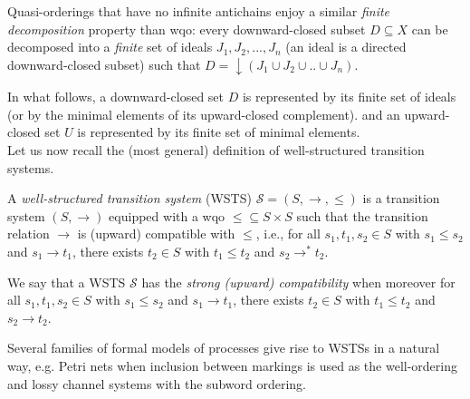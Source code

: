 \noindent
Quasi-orderings that have no infinite antichains enjoy a similar \emph{finite decomposition} property than wqo: every downward-closed subset $D \subseteq X$ can be decomposed into a \emph{finite} set of ideals $J_1, J_2,..., J_n$ (an ideal is a directed downward-closed subset) such that $D = \downarrow (J_1 \cup J_2 \cup..\cup J_n)$.

In what follows, a downward-closed set $D$ is represented by its finite set of ideals (or by the minimal elements of its upward-closed complement).
and an upward-closed set $U$ is represented by its finite set of minimal elements. \\

\noindent
Let us now recall the (most general) definition of well-structured transition systems.

\begin{definition}\cite{DBLP:journals/iandc/Finkel90,DBLP:journals/tcs/FinkelS01}
A {\em well-structured transition system} (WSTS)  $\mathscr{S}=(S, \rightarrow, \leq)$
is a transition system $(S, \rightarrow)$
equipped with a wqo ${\leq} \subseteq S \times S$ such that  
the transition relation $ \rightarrow$ is (upward) compatible with $\leq$, i.e., for all 
$s_1, t_1 , s_2 \in S$
	with $s_1 \leq s_2$  and $s_1 \rightarrow t_1$, there exists 
	$t_2 \in S$ with 
	$t_1 \leq t_2$ and $s_2 \rightarrow^{*} t_2$.
\end{definition}

We say that a WSTS $\mathscr{S}$ has the \emph{strong (upward) compatibility} when moreover for all 
$s_1, t_1 , s_2 \in S$
	with $s_1 \leq s_2$  and $s_1 \rightarrow t_1$, there exists 
	$t_2 \in S$ with 
	$t_1 \leq t_2$ and $s_2 \rightarrow t_2$.

Several families of formal models of processes give rise to WSTSs in a natural way, e.g. Petri nets when inclusion between markings is used as the well-ordering and lossy channel systems with the subword ordering.


\iffalse
\begin{proposition}\cite{DBLP:journals/tcs/FinkelS01}
If $\mathscr{S}$ is an WSTS and $U \subseteq S$ is an upward-closed set of states, then $\pred^*(U )$ is upward-
closed.
\end{proposition}
%
Proof. Assume $s \in \pred^* (U )$. Then $s \rightarrow^* t$ for some $t \in U $. If now $s' \geq s$ then upward-compatibility entails that $s' \rightarrow^* t'$ for some $t' \geq t$. Then $t' \in U$ and $s' \in \pred^*(U )$.
\fi

